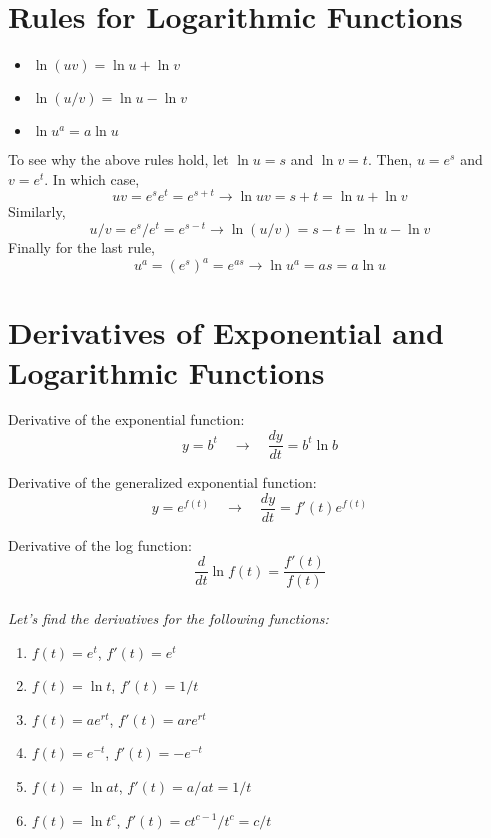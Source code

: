 \documentclass{./../Latex/handout}
\begin{document}
\section*{Rules for Logarithmic Functions}
\begin{itemize}
	\item $\ln (u v)=\ln u+\ln v$ 
	\item $\ln (u / v)=\ln u-\ln v$
	\item $\ln u^{a}=a \ln u$
\end{itemize}

To see why the above rules hold, let $\ln u = s$ and $\ln v = t$. Then, $u=e^s$ and $v=e^t$. In which case,
\[ uv = e^s e^t = e^{s+t} \rightarrow \ln uv =s+t = \ln u + \ln v \]
Similarly, 
\[ u/v = e^s/e^t = e^{s-t} \rightarrow \ln (u/v) =s-t = \ln u - \ln v \]
Finally for the last rule, 
\[u^a = (e^s)^a=e^{as} \rightarrow \ln u^a = as = a\ln u \]

\section*{Derivatives of Exponential and Logarithmic Functions}
Derivative of the exponential function:
\[ y=b^{t} \quad \rightarrow \quad \frac{dy}{dt} = b^t \ln b  \]

Derivative of the generalized exponential function:
 $$y=e^{f(t)} \quad \rightarrow \quad \frac{dy}{dt} = f'(t) e^{f(t)}$$
 
Derivative of the log function:
 $$ \frac{d}{d t} \ln f(t) =\frac{f'(t)}{f(t)} $$ \\
 
\textit{Let's find the derivatives for the following functions:}
\begin{enumerate}
\item $f(t)=e^t$, $f'(t) = e^t$
\item $f(t)=\ln t$, $f'(t) = 1/t$
\item $f(t)=ae^{rt}$, $f'(t) = are^{rt}$
\item $f(t)=e^{-t}$, $f'(t) = -e^{-t}$
\item $f(t)=\ln a t$, $f'(t) = a/at = 1/t$
\item $f(t)=\ln t^{c}$, $f'(t) = ct^{c-1}/t^c = c/t$
\end{enumerate}
\end{document}
